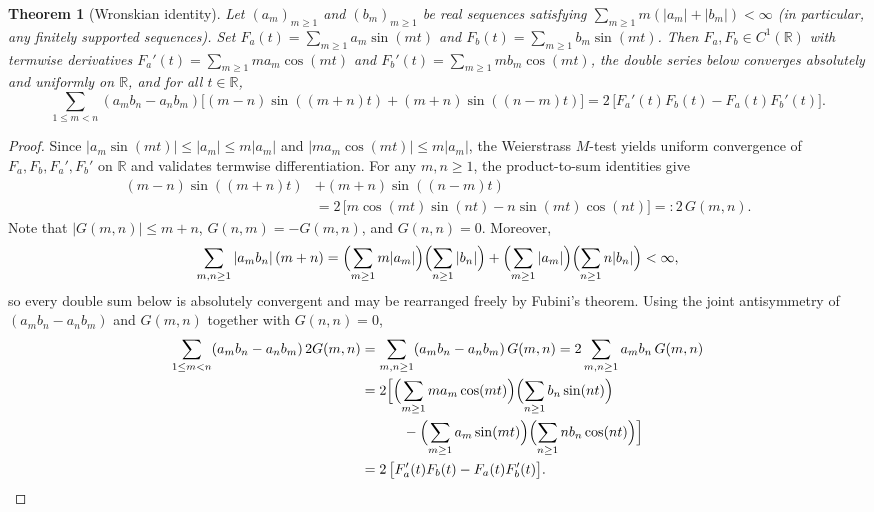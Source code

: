 \documentclass[11pt]{article}
\newtheorem{theorem}{Theorem}
\theoremstyle{remark}
\begin{document}
\begin{theorem}[Wronskian identity]
\label{thm:wronskian}
Let $(a_m)_{m\ge 1}$ and $(b_m)_{m\ge 1}$ be real sequences satisfying
$\sum_{m\ge 1} m(|a_m| + |b_m|) < \infty$ (in particular, any finitely supported sequences).
Set $F_a(t) = \sum_{m\ge 1} a_m \sin(mt)$ and $F_b(t) = \sum_{m\ge 1} b_m \sin(mt)$.
Then $F_a, F_b \in C^1(\mathbb{R})$ with termwise derivatives
$F_a'(t) = \sum_{m\ge 1} m a_m \cos(mt)$ and $F_b'(t) = \sum_{m\ge 1} m b_m \cos(mt)$,
the double series below converges absolutely and uniformly on $\mathbb{R}$, and for all
$t \in \mathbb{R}$,
\begin{equation}
\label{eq:wronskian}
\sum_{1 \le m < n} (a_m b_n - a_n b_m)
\bigl[(m-n)\sin((m+n)t) + (m+n)\sin((n-m)t)\bigr]
= 2\,\bigl[F_a'(t) F_b(t) - F_a(t) F_b'(t)\bigr].
\end{equation}
\end{theorem}

\begin{proof}
Since $|a_m \sin(mt)| \le |a_m| \le m|a_m|$ and $|m a_m \cos(mt)| \le m|a_m|$, the
Weierstrass $M$-test yields uniform convergence of $F_a, F_b, F_a', F_b'$ on $\mathbb{R}$
and validates termwise differentiation. For any $m,n \ge 1$, the product-to-sum identities
give
\begin{align*}
(m-n)\sin((m+n)t) &+ (m+n)\sin((n-m)t) \\
&= 2\,\bigl[m\cos(mt)\sin(nt) - n\sin(mt)\cos(nt)\bigr] =: 2\,G(m,n).
\end{align*}
Note that $|G(m,n)| \le m+n$, $G(n,m) = -G(m,n)$, and $G(n,n) = 0$. Moreover,
\[
\sum_{m,n \ge 1} |a_m b_n|\,(m+n)
= \Bigl(\sum_{m\ge 1} m|a_m|\Bigr)\Bigl(\sum_{n\ge 1} |b_n|\Bigr)
+ \Bigl(\sum_{m\ge 1} |a_m|\Bigr)\Bigl(\sum_{n\ge 1} n|b_n|\Bigr)
< \infty,
\]
so every double sum below is absolutely convergent and may be rearranged freely by Fubini's
theorem. Using the joint antisymmetry of $(a_m b_n - a_n b_m)$ and $G(m,n)$ together with
$G(n,n)=0$,
\begin{align*}
\sum_{1\le m < n} (a_m b_n - a_n b_m)\, 2G(m,n)
&= \sum_{m,n \ge 1} (a_m b_n - a_n b_m)\, G(m,n)
 = 2 \sum_{m,n \ge 1} a_m b_n\, G(m,n) \\
&= 2\Bigl[\Bigl(\sum_{m\ge 1} m a_m \cos(mt)\Bigr)\Bigl(\sum_{n\ge 1} b_n \sin(nt)\Bigr) \\
&\qquad\quad - \Bigl(\sum_{m\ge 1} a_m \sin(mt)\Bigr)\Bigl(\sum_{n\ge 1} n b_n \cos(nt)\Bigr)\Bigr] \\
&= 2\,\bigl[F_a'(t) F_b(t) - F_a(t) F_b'(t)\bigr]. \qedhere
\end{align*}
\end{proof}
\end{document}
